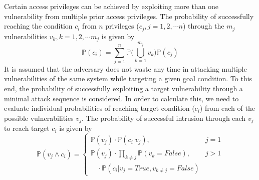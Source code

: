 Certain access privileges can be achieved by exploiting more than one vulnerability from multiple prior access privileges. The probability of successfully reaching the condition $c_i$ from $n$ privileges ($c_j,j=1,2,\cdots n$) through the $m_j$ vulnerabilities $v_k,k=1,2,\cdots m_j$ is given by
\begin{equation}
\mathbb{P}(c_i)=\sum_{j=1}^{n}{\mathbb{P}\bigg(\bigcup_{k=1}^{m_j}v_k\bigg)\mathbb{P}(c_j)}
\end{equation} 
It is assumed that the adversary does not waste any time in attacking multiple vulnerabilities of the same system while targeting a given goal condition. To this end, the probability of successfully exploiting a target vulnerability through a minimal attack sequence is considered. In order to calculate this, we need to evaluate individual probabilities of reaching target condition ($c_i$) from each of the possible vulnerabilities $v_j$. The probability of successful intrusion through each $v_j$ to reach target $c_i$ is given by
\begin{equation}
\mathbb{P}(v_j\wedge c_i)=
\begin{cases}
\mathbb{P}(v_j)\cdot\mathbb{P}(c_i|v_j), &j=1\\
\mathbb{P}(v_j)\cdot\prod_{k\neq j}\mathbb{P}(v_k=False), &j>1\\
\quad\cdot\mathbb{P}(c_i|v_j=True,v_{k\neq j}=False) &
\end{cases}
\end{equation}